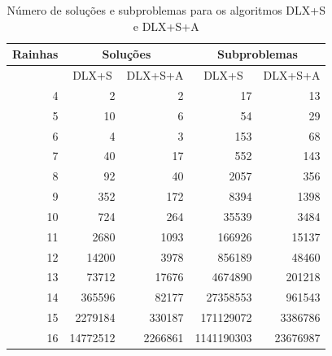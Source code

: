 \documentclass{article}
\begin{document}
\begin{center}
  \begin{table}
  \centering
  \begin{tabular}{ r r r r r }
    \hline
    \multicolumn{1}{c}{Rainhas}     & \multicolumn{2}{|c|}{Soluções} & \multicolumn{2}{c}{Subproblemas} \\
    \hline
    \multicolumn{1}{c}{}      & \multicolumn{1}{|c|}{DLX+S} & \multicolumn{1}{c|}{DLX+S+A} & \multicolumn{1}{c|}{DLX+S} & \multicolumn{1}{c}{DLX+S+A} \\
    \hline
    4             & 2                 & 2                    & 17                        & 13       \\
    5             & 10                & 6                    & 54                        & 29       \\
    6             & 4                 & 3                    & 153                       & 68       \\
    7             & 40                & 17                   & 552                       & 143      \\
    8             & 92                & 40                   & 2057                      & 356      \\
    9             & 352               & 172                  & 8394                      & 1398     \\
    10            & 724               & 264                  & 35539                     & 3484     \\
    11            & 2680              & 1093                 & 166926                    & 15137    \\
    12            & 14200             & 3978                 & 856189                    & 48460    \\
    13            & 73712             & 17676                & 4674890                   & 201218   \\
    14            & 365596            & 82177                & 27358553                  & 961543   \\
    15            & 2279184           & 330187               & 171129072                 & 3386786  \\
    16            & 14772512          & 2266861              & 1141190303                & 23676987 \\
    \hline
  \end{tabular}
  \caption{Número de soluções e subproblemas para os algoritmos DLX+S e DLX+S+A }
  \label{tab:tab_4}
  \end{table}
\end{center}
\end{document}

